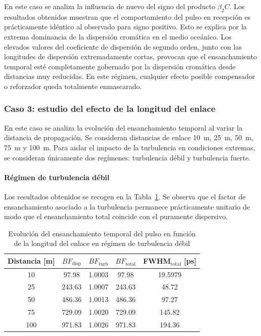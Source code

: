 En este caso se analiza la influencia de nuevo del signo del producto $\beta_{2}C$. 
Los resultados obtenidos muestran que el comportamiento del pulso en recepción es prácticamente idéntico al observado para signo positivo. Esto se explica por la extrema dominancia de la dispersión cromática en el medio oceánico. Los elevados valores del coeficiente de dispersión de segundo orden, junto con las longitudes de dispersión extremadamente cortas, provocan que el ensanchamiento temporal esté completamente gobernado por la dispersión cromática desde distancias muy reducidas. En este régimen, cualquier efecto posible compensador o reforzador queda totalmente enmascarado.


\subsubsection*{Caso 3: estudio del efecto de la longitud del enlace}
En este caso se analiza la evolución del ensanchamiento temporal al variar la distancia de propagación. Se consideran distancias de enlace \SI{10}{\meter}, \SI{25}{\meter}, \SI{50}{\meter}, \SI{75}{\meter} y \SI{100}{\meter}. Para aislar el impacto de la turbulencia en condiciones extremas, se consideran únicamente dos regímenes: turbulencia débil y turbulencia fuerte.

\paragraph{Régimen de turbulencia débil}
Los resultados obtenidos se recogen en la Tabla~\ref{tabla_oceano_longitud_debil}. Se observa que el factor de ensanchamiento asociado a la turbulencia permanece prácticamente unitario de modo que el ensanchamiento total coincide con el puramente dispersivo.


\begin{table}[H]
\centering
\hspace*{-0.8cm}
\renewcommand{\arraystretch}{1.2}
\begin{tabular}{|c|c|c|c|c|}
\hline
\textbf{Distancia [m]} &
\textbf{$BF_{\mathrm{disp}}$} &
\textbf{$BF_{\mathrm{turb}}$} &
\textbf{$BF_{\mathrm{total}}$} &
\textbf{FWHM$_{\mathrm{total}}$ [ps]} \\
\hline
10  & 97.98  & 1.0003  & 97.98  & 19.5979 \\
25  & 243.63 & 1.0007  & 243.63 & 48.72 \\
50  & 486.36 & 1.0013  & 486.36 & 97.27 \\
75  & 729.09 & 1.0020  & 729.09 & 145.82 \\
100 & 971.83 & 1.0026  & 971.83 & 194.36 \\
\hline
\end{tabular}
\caption{ Evolución del ensanchamiento temporal del pulso en función de la longitud del enlace en régimen de turbulencia débil}
\label{tabla_oceano_longitud_debil}
\end{table}


